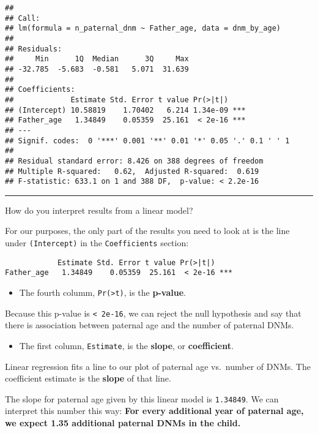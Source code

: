 \documentclass[
]{article}
\providecommand{\tightlist}{%
  \setlength{\itemsep}{0pt}\setlength{\parskip}{0pt}}
\begin{document}
\begin{verbatim}
## 
## Call:
## lm(formula = n_paternal_dnm ~ Father_age, data = dnm_by_age)
## 
## Residuals:
##     Min      1Q  Median      3Q     Max 
## -32.785  -5.683  -0.581   5.071  31.639 
## 
## Coefficients:
##             Estimate Std. Error t value Pr(>|t|)    
## (Intercept) 10.58819    1.70402   6.214 1.34e-09 ***
## Father_age   1.34849    0.05359  25.161  < 2e-16 ***
## ---
## Signif. codes:  0 '***' 0.001 '**' 0.01 '*' 0.05 '.' 0.1 ' ' 1
## 
## Residual standard error: 8.426 on 388 degrees of freedom
## Multiple R-squared:   0.62,  Adjusted R-squared:  0.619 
## F-statistic: 633.1 on 1 and 388 DF,  p-value: < 2.2e-16
\end{verbatim}

\begin{center}\rule{0.5\linewidth}{0.5pt}\end{center}

How do you interpret results from a linear model?

For our purposes, the only part of the results you need to look at is
the line under \texttt{(Intercept)} in the \texttt{Coefficients}
section:

\begin{verbatim}
            Estimate Std. Error t value Pr(>|t|)
Father_age   1.34849    0.05359  25.161  < 2e-16 ***
\end{verbatim}

\begin{itemize}
\tightlist
\item
  The fourth columm, \texttt{Pr(\textgreater{}\textbar{}t\textbar{})},
  is the \textbf{p-value}.
\end{itemize}

Because this p-value is \texttt{\textless{}\ 2e-16}, we can reject the
null hypothesis and say that there is association between paternal age
and the number of paternal DNMs.

\begin{itemize}
\tightlist
\item
  The first column, \texttt{Estimate}, is the \textbf{slope}, or
  \textbf{coefficient}.
\end{itemize}

Linear regression fits a line to our plot of paternal age vs.~number of
DNMs. The coefficient estimate is the \textbf{slope} of that line.

The slope for paternal age given by this linear model is
\texttt{1.34849}. We can interpret this number this way: \textbf{For
every additional year of paternal age, we expect 1.35 additional
paternal DNMs in the child.}
\end{document}
